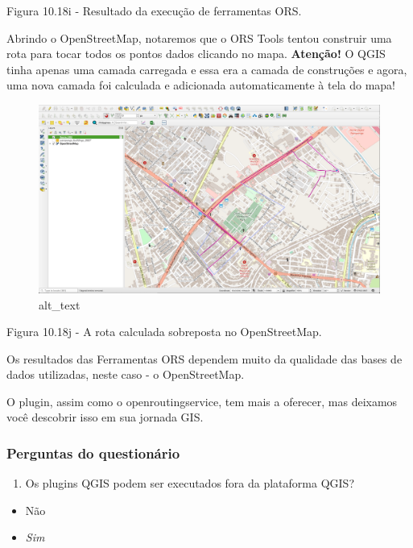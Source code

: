 \documentclass[
  portuguese,
]{krantz}
\providecommand{\tightlist}{%
  \setlength{\itemsep}{0pt}\setlength{\parskip}{0pt}}
\begin{document}
Figura 10.18i - Resultado da execução de ferramentas ORS.

Abrindo o OpenStreetMap, notaremos que o ORS Tools tentou construir uma rota para tocar todos os pontos dados clicando no mapa. \textbf{Atenção!} O QGIS tinha apenas uma camada carregada e essa era a camada de construções e agora, uma nova camada foi calculada e adicionada automaticamente à tela do mapa!

\begin{figure}
\centering
\includegraphics{media/modulo10/fig1018_j.png}
\caption{alt\_text}
\end{figure}

Figura 10.18j - A rota calculada sobreposta no OpenStreetMap.

Os resultados das Ferramentas ORS dependem muito da qualidade das bases de dados utilizadas, neste caso - o OpenStreetMap.

O plugin, assim como o openroutingservice, tem mais a oferecer, mas deixamos você descobrir isso em sua jornada GIS.

\hypertarget{perguntas-do-questionuxe1rio-19}{%
\subsubsection{\texorpdfstring{\textbf{Perguntas do questionário}}{Perguntas do questionário}}\label{perguntas-do-questionuxe1rio-19}}

\begin{enumerate}
\def\labelenumi{\arabic{enumi}.}
\tightlist
\item
  Os plugins QGIS podem ser executados fora da plataforma QGIS?
\end{enumerate}

\begin{itemize}
\tightlist
\item
  { Não }
\item
  \emph{Sim}
\end{itemize}
\end{document}
